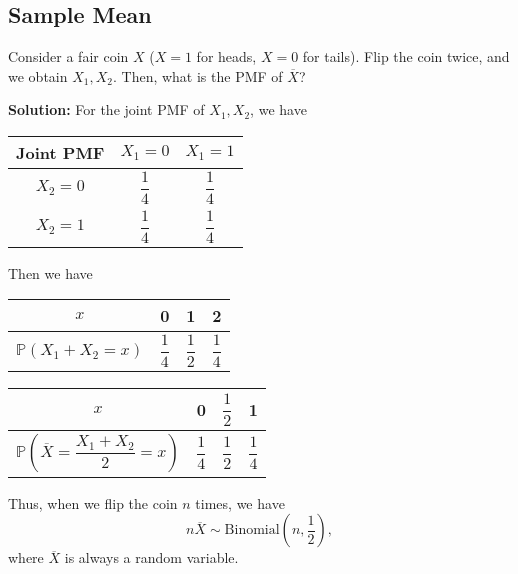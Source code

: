\subsection{Sample Mean}
\begin{eg}
  Consider a fair coin \(X\) (\(X = 1\) for heads, \(X = 0\) for tails). Flip the coin twice, and we obtain \(X_1, X_2\). Then, what is the PMF of \(\overline{X}\)?
  
  \textbf{Solution:} 
  For the joint PMF of \(X_1, X_2\), we have 
  \begin{table}[H]
    \centering
    \begin{tabular}{c|c|c}
        \toprule
        Joint PMF & \(X_1 = 0\) & \(X_1 = 1\)  \\
      \midrule
        \(X_2 = 0\) & \(\dfrac{1}{4}\) & \(\dfrac{1}{4}\)  \\[8pt]
        \(X_2 = 1\) & \(\dfrac{1}{4}\) & \(\dfrac{1}{4}\)  \\
        \bottomrule
    \end{tabular}
  \end{table}

Then we have 

\begin{minipage}{0.5\textwidth}
  \begin{table}[H]
    \centering
    \begin{tabular}{c|c|c|c}
        \toprule
        \(x\) & 0 & 1 & 2  \\
      \midrule
        \(\mathbb{P}(X_1 + X_2 = x)\) & \(\dfrac{1}{4}\) & \(\dfrac{1}{2}\) & \(\dfrac{1}{4}\) \\
        \bottomrule
    \end{tabular}
  \end{table}
\end{minipage}
\begin{minipage}{0.5\textwidth}
  \begin{table}[H]
    \centering
    \begin{tabular}{c|c|c|c}
        \toprule
        \(x\) & 0 & \(\dfrac{1}{2}\) & 1  \\
      \midrule
        \(\mathbb{P}(\overline{X} = \dfrac{X_1 + X_2}{2} = x)\) & \(\dfrac{1}{4}\) & \(\dfrac{1}{2}\) & \(\dfrac{1}{4}\) \\
        \bottomrule
    \end{tabular}
  \end{table}
\end{minipage}

Thus, when we flip the coin \(n\) times, we have 
\[
  n\overline{X} \sim \text{Binomial}(n, \dfrac{1}{2}),
\]
where \(\overline{X}\) is always a random variable. 
\end{eg}

